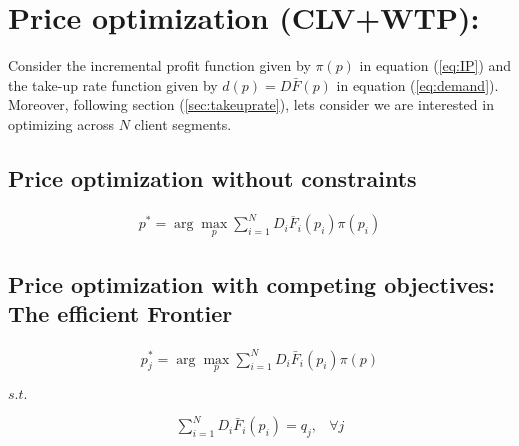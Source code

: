 \chapter{Price optimization (CLV+WTP): }

Consider the incremental profit function given by $\pi(p)$ in equation (\ref{eq:IP}) and the take-up rate function given by $d(p)=D\bar{F}(p)$ in equation (\ref{eq:demand}). Moreover, following section (\ref{sec:takeuprate}), lets consider we are interested in optimizing across $N$ client segments.
\section{Price optimization without constraints}
\begin{align}
p^*= \arg \max_p \sum_{i=1}^N D_i\overline{F}_i(p_i)\pi(p_i)
\end{align}

\section{Price optimization with competing objectives: The efficient Frontier}

\begin{align}
p^*_j= \arg \max_p \sum_{i=1}^N D_i\bar{F}_i(p_i)\pi(p)
\end{align}
\begin{center}
    $s.t.$
\end{center}
\begin{align}
\sum_{i=1}^N D_i\bar{F}_i(p_i) =q_j,& \forall j
\end{align}